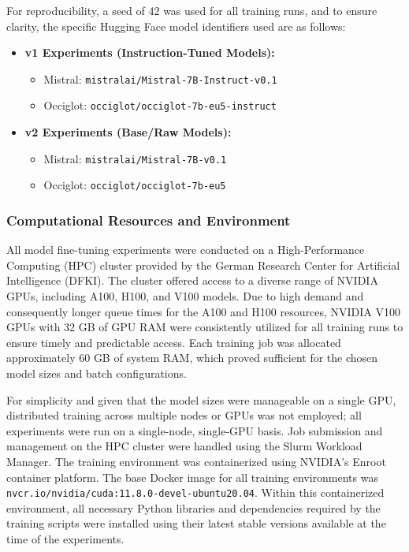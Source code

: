For reproducibility, a seed of 42 was used for all training runs, and to ensure clarity, the specific Hugging Face model identifiers used are as follows:
\begin{itemize}
    \item \textbf{v1 Experiments (Instruction-Tuned Models):}
    \begin{itemize}
        \item Mistral: \texttt{mistralai/Mistral-7B-Instruct-v0.1}
        \item Occiglot: \texttt{occiglot/occiglot-7b-eu5-instruct}
    \end{itemize}
    \item \textbf{v2 Experiments (Base/Raw Models):}
    \begin{itemize}
        \item Mistral: \texttt{mistralai/Mistral-7B-v0.1}
        \item Occiglot: \texttt{occiglot/occiglot-7b-eu5}
    \end{itemize}
\end{itemize}


\subsubsection{Computational Resources and Environment}

All model fine-tuning experiments were conducted on a High-Performance Computing (HPC) cluster provided by the German Research Center for Artificial Intelligence (DFKI).
The cluster offered access to a diverse range of NVIDIA GPUs, including A100, H100, and V100 models.
Due to high demand and consequently longer queue times for the A100 and H100 resources, NVIDIA V100 GPUs with 32 GB of GPU RAM were consistently utilized for all training runs to ensure timely and predictable access.
Each training job was allocated approximately 60 GB of system RAM, which proved sufficient for the chosen model sizes and batch configurations.

For simplicity and given that the model sizes were manageable on a single GPU, distributed training across multiple nodes or GPUs was not employed; all experiments were run on a single-node, single-GPU basis.
Job submission and management on the HPC cluster were handled using the Slurm Workload Manager.
The training environment was containerized using NVIDIA's Enroot container platform. The base Docker image for all training environments was \texttt{nvcr.io/nvidia/cuda:11.8.0-devel-ubuntu20.04}.
Within this containerized environment, all necessary Python libraries and dependencies required by the training scripts were installed using their latest stable versions available at the time of the experiments.


